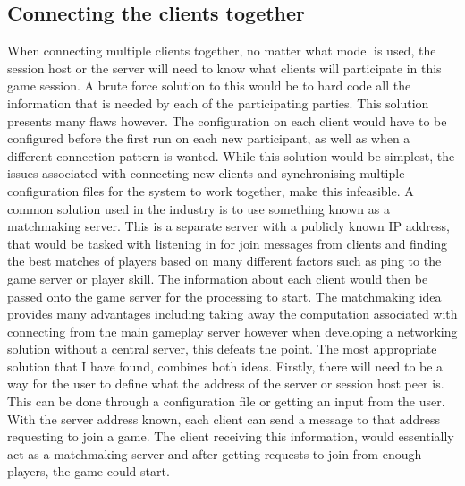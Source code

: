 \subsection{Connecting the clients together} \label{sec:client_connections}
When connecting multiple clients together, no matter what model is used, the session host or the server will need to know what clients will participate in this game session. A brute force solution to this would be to hard code all the information that is needed by each of the participating parties. This solution presents many flaws however. The configuration on each client would have to be configured before the first run on each new participant, as well as when a different connection pattern is wanted. While this solution would be simplest, the issues associated with connecting new clients and synchronising multiple configuration files for the system to work together, make this infeasible.
A common solution used in the industry is to use something known as a matchmaking server. This is a separate server with a publicly known IP address, that would be tasked with listening in for join messages from clients and finding the best matches of players based on many different factors such as ping to the game server or player skill. The information about each client would then be passed onto the game server for the processing to start. The matchmaking idea provides many advantages including taking away the computation associated with connecting from the main gameplay server however when developing a networking solution without a central server, this defeats the point.
The most appropriate solution that I have found, combines both ideas. Firstly, there will need to be a way for the user to define what the address of the server or session host peer is. This can be done through a configuration file or getting an input from the user. With the server address known, each client can send a message to that address requesting to join a game. The client receiving this information, would essentially act as a matchmaking server and after getting requests to join from enough players, the game could start.

